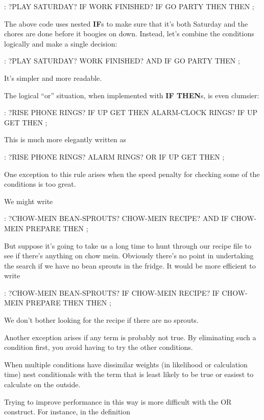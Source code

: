 \begin{Code}
: ?PLAY   SATURDAY? IF  WORK FINISHED? IF
     GO PARTY  THEN  THEN ;
\end{Code}
The above code uses nested \textbf{IF}s to make sure that it's both Saturday and
the chores are done before it boogies on down. Instead, let's combine the
conditions logically and make a single decision:

\begin{Code}
: ?PLAY   SATURDAY?  WORK FINISHED? AND  IF
     GO PARTY  THEN ;
\end{Code}
It's simpler and more readable.

The logical ``or'' situation, when implemented with \textbf{IF THEN}s, is
even clumsier:

\begin{Code}
: ?RISE    PHONE RINGS? IF  UP GET  THEN
     ALARM-CLOCK RINGS?  IF UP GET THEN ;
\end{Code}
This is much more elegantly written as

\begin{Code}
: ?RISE  PHONE RINGS?  ALARM RINGS? OR  IF  UP GET THEN ;
\end{Code}
One exception to this rule arises when the speed penalty for checking
some of the conditions is too great.

We might write

\begin{Code}
: ?CHOW-MEIN   BEAN-SPROUTS?  CHOW-MEIN RECIPE?  AND IF
   CHOW-MEIN PREPARE  THEN ;
\end{Code}
But suppose it's going to take us a long time to hunt through our recipe
file to see if there's anything on chow mein. Obviously there's no point in
undertaking the search if we have no bean sprouts in the fridge. It would
be more efficient to write

\begin{Code}
: ?CHOW-MEIN   BEAN-SPROUTS? IF  CHOW-MEIN RECIPE? IF
   CHOW-MEIN PREPARE THEN   THEN ;
\end{Code}
We don't bother looking for the recipe if there are no sprouts.

Another exception arises if any term is probably not true. By
eliminating such a condition first, you avoid having to try the other
conditions.

\begin{tip}
When multiple conditions have dissimilar weights (in likelihood or
calculation time) nest conditionals with the term that is least likely
to be true or easiest to calculate on the outside.
\end{tip}
Trying to improve performance in this way is more difficult with the OR
construct. For instance, in the definition

